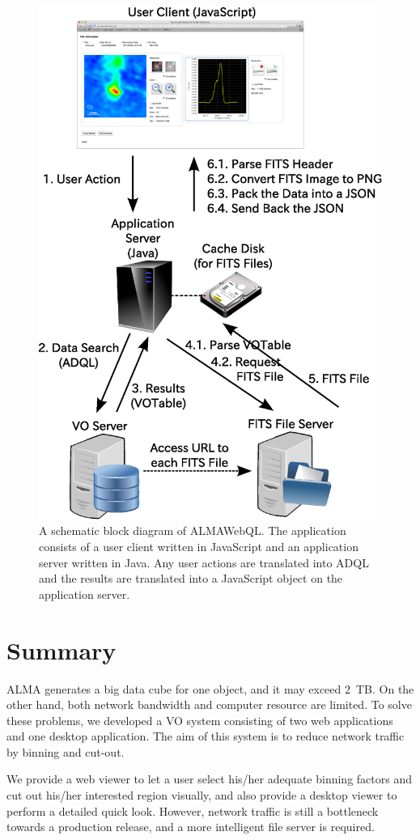 \begin{figure}[tbh]
	\begin{center}
		\includegraphics[keepaspectratio,width=0.54\hsize,clip]{part9/Eguchi_O10/O10_f3.eps}
	\end{center}
	\caption{A schematic block diagram of ALMAWebQL. The application consists of a user client written in JavaScript and an application server written in Java. Any user actions are translated into ADQL and the results are translated into a JavaScript object on the application
	server.\label{O10_f3}}
\end{figure}%

\section{Summary}

ALMA generates a big data cube for one object, and it may exceed 2\ TB. On the other hand, both network bandwidth and computer resource are limited. To solve these problems, we developed a VO system consisting of two web applications and one desktop application. The aim of this system is to reduce network traffic by binning and cut-out.

We provide a web viewer to let a user select his/her adequate binning factors and cut out his/her interested region visually, and also provide a desktop viewer to perform a detailed quick look. However, network traffic is still a bottleneck towards a production release, and a more intelligent file server is required.



